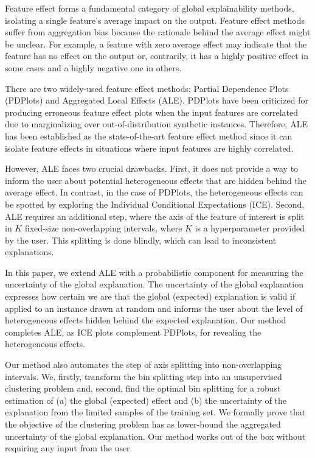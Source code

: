 \documentclass[twoside]{article}
\begin{document}
Feature effect forms a fundamental category of global explainability methods, isolating a single feature's average impact on the output. Feature effect methods suffer from aggregation bias because the rationale behind the average effect might be unclear. For example, a feature with zero average effect may indicate that the feature has no effect on the output or, contrarily, it has a highly positive effect in some cases and a highly negative one in others.

There are two widely-used feature effect methods; Partial Dependence Plots (PDPlots)\citep{friedman2001greedy} and Aggregated Local Effects (ALE)\citep{apley2020visualizing}. PDPlots have been criticized for producing erroneous feature effect plots when the input features are correlated due to marginalizing over out-of-distribution synthetic instances. Therefore, ALE has been established as the state-of-the-art feature effect method since it can isolate feature effects in situations where input features are highly correlated. 

However, ALE faces two crucial drawbacks. First, it does not provide a way to inform the user about potential heterogeneous effects that are hidden behind the average effect. In contrast, in the case of PDPlots, the heterogeneous effects can be spotted by exploring the Individual Conditional Expectations (ICE)\citep{goldstein2015peeking}. Second, ALE requires an additional step, where the axis of the feature of interest is split in \(K\) fixed-size non-overlapping intervals, where \(K\) is a hyperparameter provided by the user. This splitting is done blindly, which can lead to inconsistent explanations.

In this paper, we extend ALE with a probabilistic component for measuring the uncertainty of the global explanation. The uncertainty of the global explanation expresses how certain we are that the global (expected) explanation is valid if applied to an instance drawn at random and informs the user about the level of heterogeneous effects hidden behind the expected explanation. Our method completes ALE, as ICE plots complement PDPlots, for revealing the heterogeneous effects.

Our method also automates the step of axis splitting into non-overlapping intervals. We, firstly, transform the bin splitting step into an unsupervised clustering problem and, second, find the optimal bin splitting for a robust estimation of (a) the global (expected) effect and (b) the uncertainty of the explanation from the limited samples of the training set. We formally prove that the objective of the clustering problem has as lower-bound the aggregated uncertainty of the global explanation. Our method works out of the box without requiring any input from the user.
\end{document}
